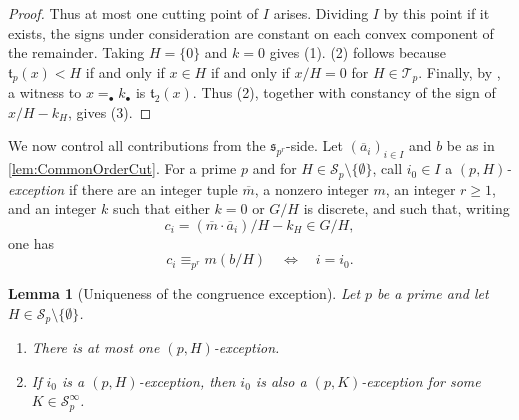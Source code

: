 \documentclass{article}
\theoremstyle{definition}
\theoremstyle{remark}
\theoremstyle{plain}
\newtheorem{lem}[dfn]{Lemma}
\begin{document}
\begin{proof}
	Thus at most one cutting point of $I$ arises.
	Dividing $I$ by this point if it exists, the signs under consideration are constant on each convex component of the remainder.
	Taking $H=\{0\}$ and $k=0$ gives (1).
	(2) follows because $\mathfrak{t}_p(x) < H$ if and only if $x \in H$ if and only if $x / H = 0$ for $H\in\mathcal{T}_p$.
	Finally, by \cite[Lemma 2.21(1)]{Okura2026DisOrd}, a witness to $x=_{\bullet}k_{\bullet}$ is $\mathfrak{t}_2(x)$.
	Thus (2), together with constancy of the sign of $x/H-k_H$, gives (3).
\end{proof}

We now control all contributions from the $\mathfrak{s}_{p^r}$-side.
Let $(\overline{a}_i)_{i\in I}$ and $b$ be as in \autoref{lem:CommonOrderCut}.
For a prime $p$ and for $H \in \mathcal{S}_p \setminus \{\emptyset\}$, call $i_0\in I$ a \emph{$(p,H)$-exception} if there are an integer tuple $\overline{m}$, a nonzero integer $m$, an integer $r\geq 1$, and an integer $k$ such that either $k=0$ or $G/H$ is discrete, and such that, writing
\[
	c_i
	=
	(\overline{m}\cdot\overline{a}_i)/H-k_H
	\in
	G/H,
\]
one has
\[
	c_i
	\equiv_{p^r}
	m(b/H)
	\quad\Longleftrightarrow\quad
	i=i_0.
\]

\begin{lem}[Uniqueness of the congruence exception]\label{lem:UniqueCongruenceException}
	Let $p$ be a prime and let $H \in \mathcal{S}_p \setminus \{\emptyset\}$.
	\begin{enumerate}
		\item There is at most one $(p,H)$-exception.
		\item If $i_0$ is a $(p,H)$-exception, then $i_0$ is also a $(p,K)$-exception for some $K \in \mathcal{S}_p^\infty$.
	\end{enumerate}
\end{lem}
\end{document}

